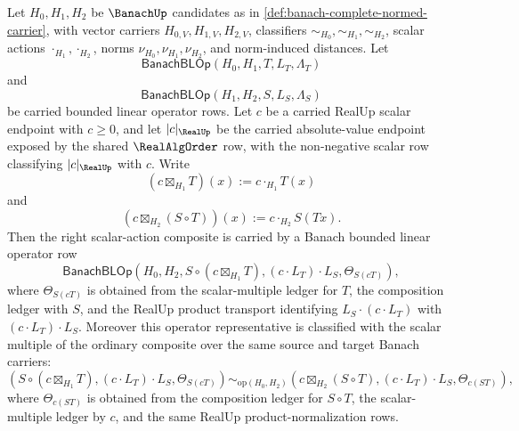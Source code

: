 \begin{theorem}
\label{thm:banach-bounded-linear-operator-scalar-action-right-composition-distribution}
Let $H_0,H_1,H_2$ be $\BanachUp$ candidates as in
\autoref{def:banach-complete-normed-carrier}, with vector carriers
$H_{0,V},H_{1,V},H_{2,V}$, classifiers
$\sim_{H_0},\sim_{H_1},\sim_{H_2}$, scalar actions
$\cdot_{H_1},\cdot_{H_2}$, norms $\nu_{H_0},\nu_{H_1},\nu_{H_2}$,
and norm-induced distances. Let
$$
\mathsf{BanachBLOp}(H_0,H_1,T,L_T,\Lambda_T)
$$
and
$$
\mathsf{BanachBLOp}(H_1,H_2,S,L_S,\Lambda_S)
$$
be carried bounded linear operator rows. Let $c$ be a carried RealUp scalar
endpoint with $c\ge0$, and let $|c|_{\RealUp}$ be the carried absolute-value
endpoint exposed by the shared $\RealAlgOrder$ row, with the non-negative
scalar row classifying $|c|_{\RealUp}$ with $c$. Write
$$
(c\boxtimes_{H_1}T)(x):=c\cdot_{H_1}T(x)
$$
and
$$
(c\boxtimes_{H_2}(S\circ T))(x):=c\cdot_{H_2}S(Tx).
$$
Then the right scalar-action composite is carried by a Banach bounded linear
operator row
$$
\mathsf{BanachBLOp}
(H_0,H_2,S\circ(c\boxtimes_{H_1}T),(c\cdot L_T)\cdot L_S,
\Theta_{S(cT)}),
$$
where $\Theta_{S(cT)}$ is obtained from the scalar-multiple ledger for $T$,
the composition ledger with $S$, and the RealUp product transport identifying
$L_S\cdot(c\cdot L_T)$ with $(c\cdot L_T)\cdot L_S$. Moreover this operator
representative is classified with the scalar multiple of the ordinary
composite over the same source and target Banach carriers:
$$
(S\circ(c\boxtimes_{H_1}T),(c\cdot L_T)\cdot L_S,\Theta_{S(cT)})
\sim_{\mathrm{op}(H_0,H_2)}
(c\boxtimes_{H_2}(S\circ T),(c\cdot L_T)\cdot L_S,\Theta_{c(ST)}),
$$
where $\Theta_{c(ST)}$ is obtained from the composition ledger for $S\circ T$,
the scalar-multiple ledger by $c$, and the same RealUp product-normalization
rows.
\end{theorem}
